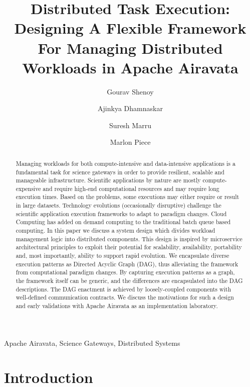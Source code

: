 \documentclass[review]{elsarticle}
\begin{document}
\begin{frontmatter}

\title{Distributed Task Execution: Designing A Flexible Framework For Managing Distributed Workloads in Apache Airavata}

\author{Gourav Shenoy}
\author{Ajinkya Dhamnaskar}
\author{Suresh Marru}
\author{Marlon Piece}

\address{Science Gateways Research Center, Pervasive Technology Institute}
\address{Indiana University, Bloomington, IN 47408, USA}

\begin{abstract}
Managing workloads for both compute-intensive and data-intensive applications is a fundamental task for science gateways in order to provide resilient, scalable and manageable infrastructure. Scientific applications by nature are mostly compute-expensive and require high-end computational resources and may require long execution times. Based on the problems, some executions may either require or result in large datasets. Technology evolutions (occasionally disruptive) challenge the scientific application execution frameworks to adapt to paradigm changes. Cloud Computing has added on demand computing to the traditional batch queue based computing. In this paper we discuss a system design which divides workload management logic into distributed components. This design is inspired by microservice architectural principles to exploit their potential for scalability, availability, portability and, most importantly, ability to support rapid evolution. We encapsulate diverse execution patterns as Directed Acyclic Graph (DAG), thus alleviating the framework from computational paradigm changes. By capturing execution patterns as a graph, the framework itself can be generic, and the differences are encapsulated into the DAG descriptions. The DAG enactment is achieved by loosely-coupled components with well-defined communication contracts. We discuss the motivations for such a design and early validations with Apache Airavata as an implementation laboratory. 
\end{abstract}

\begin{keyword}
Apache Airavata, Science Gateways, Distributed Systems
\end{keyword}

\end{frontmatter}

\linenumbers

\section{Introduction}
\end{document}
